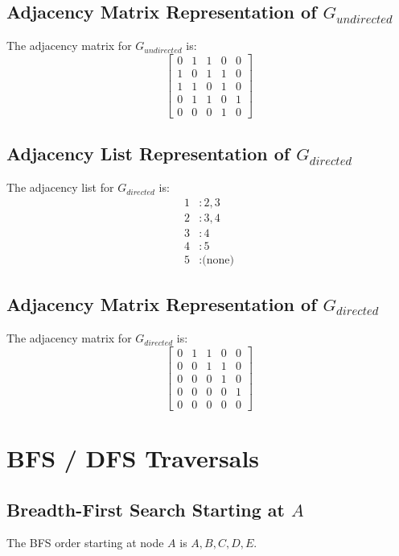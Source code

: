 \documentclass[10pt]{article}
\begin{document}
\subsection{Adjacency Matrix Representation of \( G_{undirected} \)}
The adjacency matrix for \( G_{undirected} \) is:
\[
\begin{bmatrix}
    0 & 1 & 1 & 0 & 0 \\
    1 & 0 & 1 & 1 & 0 \\ 
    1 & 1 & 0 & 1 & 0 \\ 
    0 & 1 & 1 & 0 & 1 \\ 
    0 & 0 & 0 & 1 & 0
\end{bmatrix}
\]

\subsection{Adjacency List Representation of \( G_{directed} \)}
The adjacency list for \( G_{directed} \) is:
\[
\begin{aligned}
    1 & : 2, 3 \\ 
    2 & : 3, 4 \\ 
    3 & : 4 \\ 
    4 & : 5 \\ 
    5 & : \text{(none)}
\end{aligned}
\]

\subsection{Adjacency Matrix Representation of \( G_{directed} \)}
The adjacency matrix for \( G_{directed} \) is:
\[
\begin{bmatrix}
    0 & 1 & 1 & 0 & 0 \\ 
    0 & 0 & 1 & 1 & 0 \\ 
    0 & 0 & 0 & 1 & 0 \\ 
    0 & 0 & 0 & 0 & 1 \\ 
    0 & 0 & 0 & 0 & 0
\end{bmatrix}
\]

\newpage

\section{BFS / DFS Traversals}

\subsection{Breadth-First Search Starting at \( A \)}
The BFS order starting at node \( A \) is \( A, B, C, D, E \).
\end{document}
